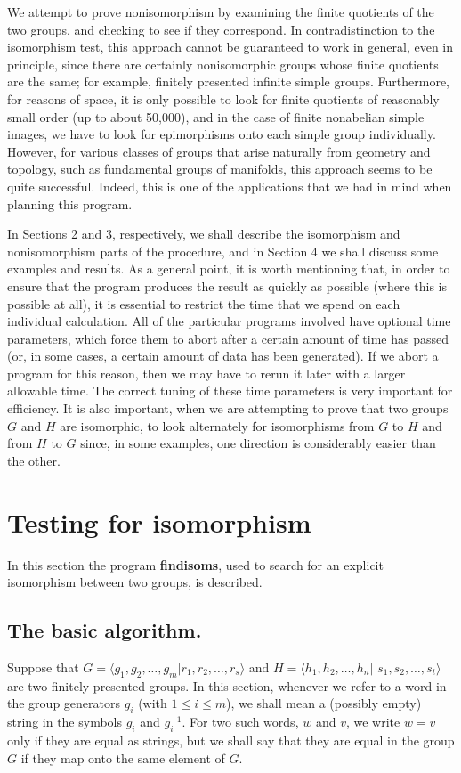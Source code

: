 We attempt to prove nonisomorphism by examining the finite quotients of the
two groups, and checking to see if they correspond. In contradistinction to
the isomorphism test, this approach cannot be guaranteed to work in general,
even in principle, since there are certainly nonisomorphic groups whose finite
quotients are the same; for example, finitely presented infinite simple
groups. Furthermore, for reasons of space, it is only possible to look
for finite quotients of reasonably small order (up to about 50,000), and in the
case of finite nonabelian simple images, we have to look for epimorphisms
onto each simple group individually. However, for various classes of groups
that arise naturally from geometry and topology, such as fundamental groups
of manifolds, this approach seems to be quite successful. Indeed, this
is one of the applications that we had in mind when planning this program.

In Sections 2 and 3, respectively, we shall describe the isomorphism and
nonisomorphism parts of the procedure, and in Section 4 we shall discuss
some examples and results. As a general point, it is worth mentioning
that, in order to ensure that the program produces the result as quickly as
possible (where this is possible at all), it is essential to restrict the
time that we spend on each individual calculation. All of the particular
programs involved have optional time parameters, which force them to abort
after a certain amount of time has passed (or, in some cases, a certain
amount of data has been generated). If we abort a program for this reason,
then we may have to rerun it later with a larger allowable time. The
correct tuning of these time parameters is very important for efficiency.
It is also important, when we are attempting to prove that two groups $G$ and
$H$ are isomorphic, to look alternately for isomorphisms from  $G$  to  $H$
and from $H$ to $G$ since, in some examples,
one direction is considerably easier than the other.
\section{Testing for isomorphism}

In this section the program {\bf findisoms}, used to search for an explicit
isomorphism between two groups, is described.

\subsection{The basic algorithm.}
Suppose that $G = \langle g_1, g_2, \ldots ,g_m | r_1, r_2, \ldots , r_s
\rangle $ and $H = \langle h_1, h_2, \ldots , h_n |$ $s_1, s_2, \ldots , s_t
\rangle $ are two finitely presented groups.
In this section, whenever we refer to a word in the group generators
$g_i$ (with $1 \leq i \leq m$),
we shall mean a (possibly empty) string in the symbols $g_i$ and
$g_i^{-1}$. For two such words, $w$ and $v$, we write $w=v$ only if they are
equal as strings, but we shall say that they are equal in the group $G$ if
they map onto the same element of $G$.


